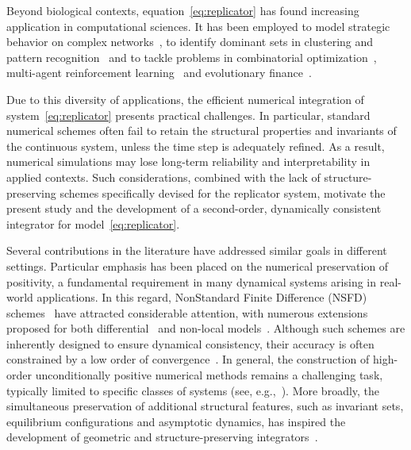 \documentclass[11pt,letterpaper]{article}
\theoremstyle{remark}
\begin{document}
Beyond biological contexts, equation~\eqref{eq:replicator} has found increasing application in computational sciences. It has been employed to model strategic behavior on complex networks~\cite{Li_2025,Networks2}, to identify dominant sets in clustering and pattern recognition~\cite{Clustering,Pavan2007} and to tackle problems in combinatorial optimization~\cite{Bomze_1997}, multi-agent reinforcement learning~\cite{Sato2002} and evolutionary finance~\cite{Weibull1995}.

Due to this diversity of applications, the efficient numerical integration of system~\eqref{eq:replicator} presents practical challenges. In particular, standard numerical schemes often fail to retain the structural properties and invariants of the continuous system, unless the time step is adequately refined. As a result, numerical simulations may lose long-term reliability and interpretability in applied contexts. Such considerations, combined with the lack of structure-preserving schemes specifically devised for the replicator system, motivate the present study and the development of a second-order, dynamically consistent integrator for model~\eqref{eq:replicator}. 

Several contributions in the literature have addressed similar goals in different settings. Particular emphasis has been placed on the numerical preservation of positivity, a fundamental requirement in many dynamical systems arising in real-world applications. In this regard, NonStandard Finite Difference (NSFD) schemes~\cite{Mickens_NSFD} have attracted considerable attention, with numerous extensions proposed for both differential~\cite{Lubuma_Chem,Conte2022,Patidar,Anguelov} and non-local models~\cite{MPV_MBE,MPV_JCD,Pezzella_ESAIM,Cardone_Fract,Fract}. Although such schemes are inherently designed to ensure dynamical consistency, their accuracy is often constrained by a low order of convergence~\cite{Hoang03102023,NSFD_High,Hoang_Second}. In general, the construction of high-order unconditionally positive numerical methods remains a challenging task, typically limited to specific classes of systems (see, e.g.,~\cite{PDS,MPV_Axioms,MPV_mixing,OFFNER202015,CdS}). More broadly, the simultaneous preservation of additional structural features, such as invariant sets, equilibrium configurations and asymptotic dynamics, has inspired the development of geometric and structure-preserving integrators~\cite{Hairer2006, Liu, LEWIS2003141, Sharma, GeCO_Izgin, GeC01, Celledoni2014, MPV_mixing, MPSL}.
\end{document}
